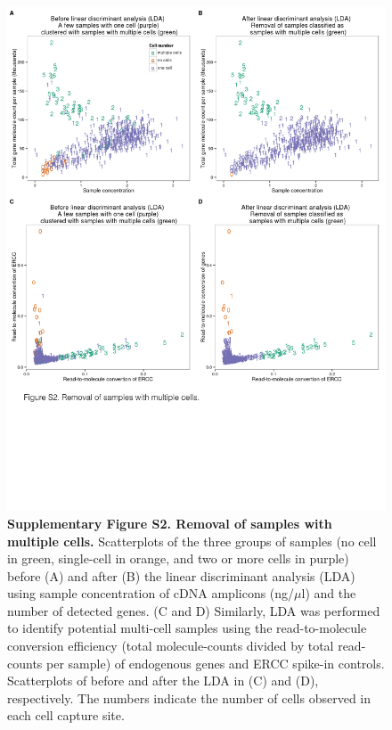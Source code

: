 \begin{figure}[htbp]
\centering
\includegraphics[width=5in]{img/ch04/Figure07.jpeg}
\caption{\textbf{Supplementary Figure S2. Removal of samples with
multiple cells.} Scatterplots of the three groups of samples (no cell in
green, single-cell in orange, and two or more cells in purple) before
(A) and after (B) the linear discriminant analysis (LDA) using sample
concentration of cDNA amplicons (ng/$\mu$l) and the number of detected
genes. (C and D) Similarly, LDA was performed to identify potential
multi-cell samples using the read-to-molecule conversion efficiency
(total molecule-counts divided by total read-counts per sample) of
endogenous genes and ERCC spike-in controls. Scatterplots of before and
after the LDA in (C) and (D), respectively. The numbers indicate the
number of cells observed in each cell capture site.}
\end{figure}

